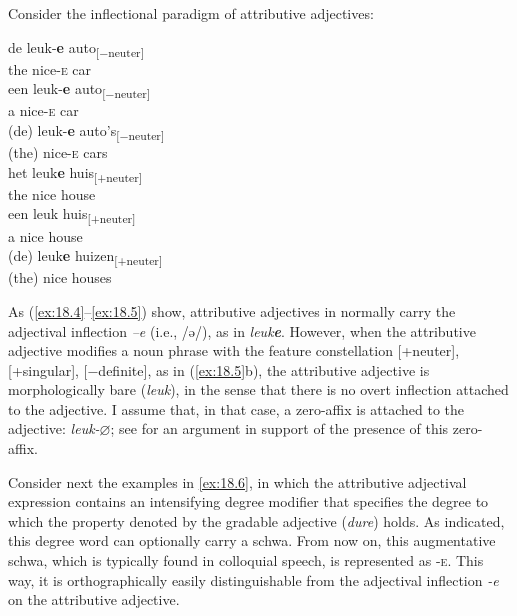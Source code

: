 \documentclass[output=paper]{langsci/langscibook}
\begin{document}
Consider the inflectional paradigm of  attributive adjectives:

\begin{multicols}{2}
\ea%
\label{ex:18.4}
	\ea
	\gll de  leuk-\textbf{e}  auto\textsubscript{[−neuter]}\\
		the    nice-\textsc{e}  car  \\
	\ex
	\gll een  leuk-\textbf{e}  auto\textsubscript{[−neuter]}\\
		a        nice-\textsc{e}  car\\
	\ex
	\gll  (de)  leuk-\textbf{e}  auto's\textsubscript{[−neuter]}\\
		(the)  nice-\textsc{e}  cars \\
	\z
\ex%
\label{ex:18.5}
	\ea
	\gll het leuk\textbf{e}  huis\textsubscript{[+neuter]}\\
		the    nice    house\\
	\ex
	\gll een leuk  huis\textsubscript{[+neuter]}\\
		a        nice  house\\
	\ex
	\gll  (de)  leuk\textbf{e}  huizen\textsubscript{[+neuter]}\\
		 (the)  nice    houses\\
	\z
\z\end{multicols}

As (\ref{ex:18.4}--\ref{ex:18.5}) show, attributive adjectives in 
normally carry the adjectival inflection \emph{–e} (i.e., /ə/), as in
\emph{leuk}\textbf{\emph{e}}. However, when the attributive adjective modifies
a noun phrase with the feature constellation [+neuter], [+singular],
[−definite], as in (\ref{ex:18.5}b), the attributive adjective is
morphologically bare (\emph{leuk}), in the sense that there is no overt
inflection attached to the adjective. I assume that, in that case, a zero-affix
is attached to the adjective: \emph{leuk-$\varnothing$}; see
 for an argument in support of the presence of this
zero-affix.

Consider next the examples in \eqref{ex:18.6}, in which the attributive
adjectival expression contains an intensifying degree modifier that specifies
the degree to which the property denoted by the gradable adjective
(\emph{dure}) holds. As indicated, this degree word can optionally carry a
schwa. From now on, this augmentative schwa, which is typically found in
colloquial speech, is represented as \textsc{-e}. This way, it is
orthographically easily distinguishable from the adjectival inflection
\emph{-e} on the attributive adjective.
\end{document}
